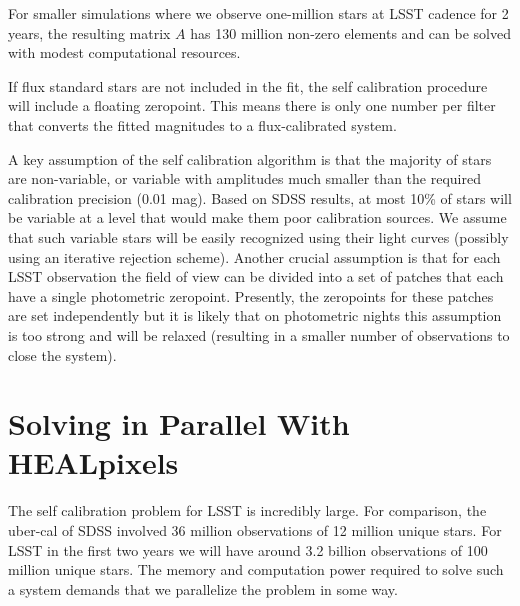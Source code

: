 \documentclass[12pt,preprint]{aastex}
\begin{document}
For smaller simulations where we observe one-million stars at LSST
cadence for 2 years, the resulting matrix $A$ has 130 million non-zero
elements and can be solved with modest computational resources.


If flux standard stars are not included in the fit, the
self calibration procedure will include a floating zeropoint.  This
means there is only one number per filter that converts the fitted
magnitudes to a flux-calibrated system.



A key assumption of the self calibration algorithm is that the
majority of stars are non-variable, or variable with amplitudes much
smaller than the required calibration precision (0.01 mag). Based on
SDSS results, at most 10\% of stars will be variable at a level that
would make them poor calibration sources.  We assume that such
variable stars will be easily recognized using their light curves
(possibly using an iterative rejection scheme).  Another crucial
assumption is that for each LSST observation the field of view can be
divided into a set of patches that each have a single photometric
zeropoint. Presently, the zeropoints for these patches are set
independently but it is likely that on photometric nights this
assumption is too strong and will be relaxed (resulting in a smaller
number of observations to close the system).



\section{Solving in Parallel With HEALpixels}\label{sec:hp}

The self calibration problem for LSST is incredibly large.  For comparison, the uber-cal of SDSS involved 36 million observations of 12 million unique stars.  For LSST in the first two years we will have around 3.2 billion observations of 100 million unique stars.  The memory and computation power required to solve such a system demands that we parallelize the problem in some way.
\end{document}
